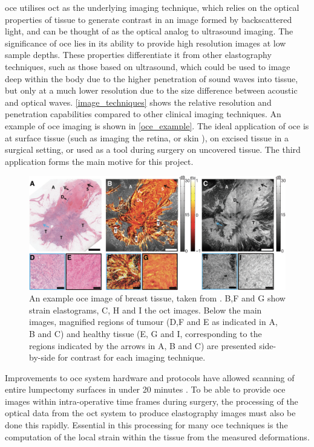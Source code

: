 \ac{oce} utilises \ac{oct} as the underlying imaging technique, which relies on the optical properties of tissue to generate contrast in an image formed by backscattered light, and can be thought of as the optical analog to ultrasound imaging. The significance of \ac{oce} lies in its ability to provide high resolution images at low sample depths. These properties differentiate it from other elastography techniques, such as those based on ultrasound, which could be used to image deep within the body due to the higher penetration of sound waves into tissue, but only at a much lower resolution due to the size difference between acoustic and optical waves. \autoref{image_techniques} shows the relative resolution and penetration capabilities compared to other clinical imaging techniques. An example of \ac{oce} imaging is shown in \autoref{oce_example}. The ideal application of \ac{oce} is at surface tissue (such as imaging the retina, or skin \cite{kennedy_review_2014}), on excised tissue in a surgical setting, or used as a tool during surgery on uncovered tissue. The third application forms the main motive for this project.

\begin{figure}[t]
	\centering
    \includegraphics[width=\textwidth]{bground_figs/oce_example.png}
	\caption{An example \ac{oce} image of breast tissue, taken from \cite{kennedy_investigation_2015}. B,F and G show strain elastograms, C, H and I the \ac{oct} images. Below the main images, magnified regions of tumour (D,F and E as indicated in A, B and C) and healthy tissue (E, G and I, corresponding to the regions indicated by the arrows in A, B and C) are presented side-by-side for contrast for each imaging technique.}
    \label{oce_example}	
\end{figure}

Improvements to \ac{oce} system hardware and protocols have allowed scanning of entire lumpectomy surfaces in under 20 minutes \cite{allen_wide-field_2016}. To be able to provide \ac{oce} images within intra-operative time frames during surgery, the processing of the optical data from the \ac{oct} system to produce elastography images must also be done this rapidly. Essential in this processing for many \ac{oce} techniques is the computation of the local strain within the tissue from the measured deformations. 

